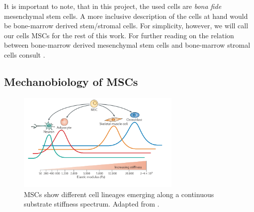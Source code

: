 It is important to note, that in this project, the used cells are \textit{bona fide} mesenchymal stem cells. A more inclusive description of the cells at hand would be bone-marrow derived stem/stromal cells. For simplicity, however, we will call our cells MSCs for the rest of this work. For further reading on the relation between bone-marrow derived mesenchymal stem cells and bone-marrow stromal cells consult \cite{Bianco2013}.

\subsection{Mechanobiology of MSCs}

\begin{figure}
	\centering
	\includegraphics[width = 0.7\textwidth]{STIFFNESS_DIFFERENTIATION.PNG}
	\caption{MSCs show different cell lineages emerging along a continuous substrate stiffness spectrum. Adapted from \cite{Halder2012}.}
	\label{fig:StiffDiff}
\end{figure}

